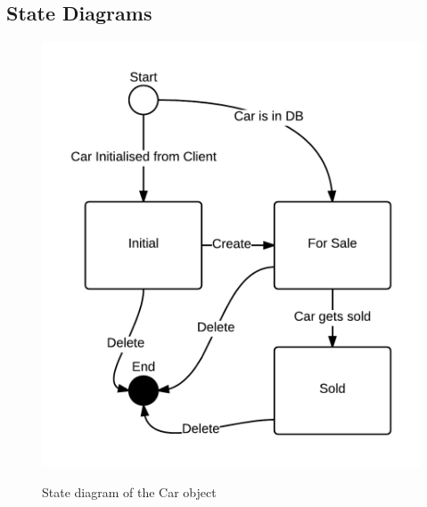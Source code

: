 \subsection{State Diagrams}
\begin{figure}[h!]
	\centering
		\includegraphics[scale=0.35]{Figures/StateDiagram-Car}\\
	\caption{State diagram of the Car object}
  \label{fig:StateDiagram-Car}
\end{figure}
